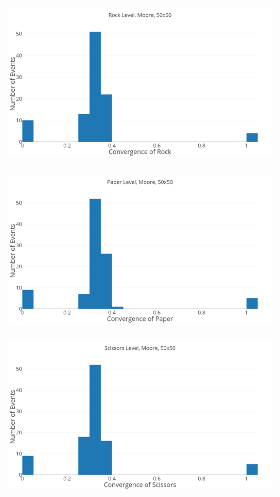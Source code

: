\documentclass[a4paper, 11pt]{article}
\begin{document}
\begin{figure}[H]
\begin{subfigure}{.65\textwidth}
	\begin{subfigure}{1\textwidth}
		\includegraphics[width=1\linewidth]{50x50_50RockDist_RockHG}
	\end{subfigure}

	\begin{subfigure}{1\textwidth}
		\includegraphics[width=1\linewidth]{50x50_50RockDist_PaperHG}
	\end{subfigure}
	
	\begin{subfigure}{1\textwidth}
		\includegraphics[width=1\linewidth]{50x50_50RockDist_ScissorsHG}
	\end{subfigure}	
	

\end{subfigure}
\end{figure}
\end{document}
